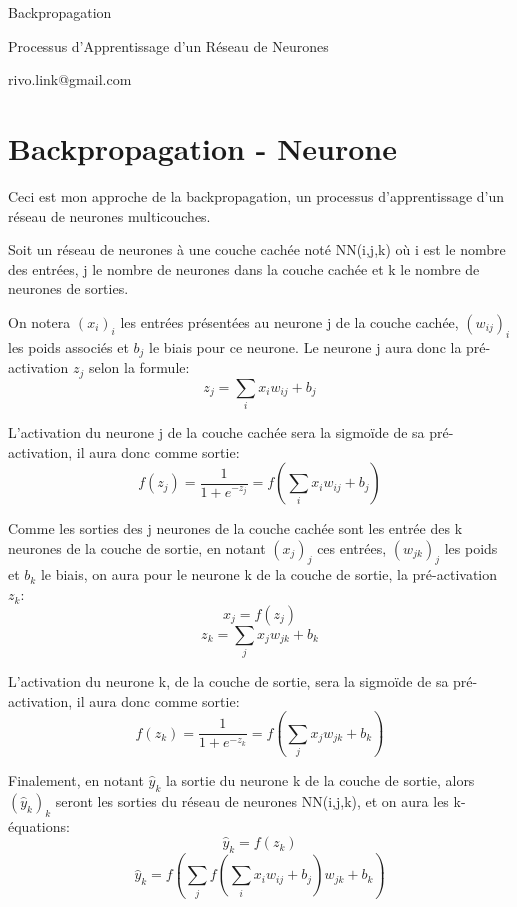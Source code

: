 \documentclass{article}
\begin{document}
\vspace*{\fill}
\begingroup
\centering
Backpropagation

Processus d'Apprentissage d'un Réseau de Neurones

rivo.link@gmail.com

\endgroup
\vspace*{\fill}

\newpage

\section{Backpropagation - Neurone}

\smallbreak
Ceci est mon approche de la backpropagation, un processus d'apprentissage d'un réseau de neurones multicouches.

\smallbreak
Soit un réseau de neurones à une couche cachée noté NN(i,j,k) où i est le nombre des entrées, j le nombre de neurones dans la couche cachée et k le nombre de neurones de sorties.

\smallbreak
On notera $(x_i)_i$ les entrées présentées au neurone j de la couche cachée, $(w_{ij})_i$ les poids associés et $b_j$ le biais pour ce neurone. Le neurone j aura donc la pré-activation $z_j$ selon la formule:
\begin{equation}
z_j=\sum_i{{x_i}{w_{ij}}}+b_j
\end{equation}

L'activation du neurone j de la couche cachée sera la sigmoïde de sa pré-activation, il aura donc comme sortie: 
\begin{equation}
f(z_j)=\frac{1}{1+e^{-z_j}}=f(\sum_i{{x_i}{w_{ij}}}+b_j)
\end{equation}

Comme les sorties des j neurones de la couche cachée sont les entrée des k neurones de la couche de sortie, en notant $(x_j)_j$ ces entrées, $(w_{jk})_j$ les poids et $b_k$ le biais, on aura pour le neurone k de la couche de sortie, la pré-activation $z_k$:
$$x_j=f(z_j)$$
\begin{equation}
z_k=\sum_j{x_j{w_{jk}}}+b_k
\end{equation}

L'activation du neurone k, de la couche de sortie, sera la sigmoïde de sa pré-activation, il aura donc comme sortie: 
\begin{equation}
f(z_k)=\frac{1}{1+e^{-z_k}}=f(\sum_j{x_j{w_{jk}}}+b_k)
\end{equation}

Finalement, en notant $\hat{y}_k$ la sortie du neurone k de la couche de sortie, alors $(\hat{y}_k)_k$ seront les sorties du réseau de neurones NN(i,j,k), et on aura les k-équations:
$$\hat{y}_k=f(z_k)$$
\begin{equation}
\hat{y}_k=f(\sum_j{f(\sum_i{x_i{w_{ij}}}+b_j){w_{jk}}}+b_k)
\end{equation}
\end{document}
